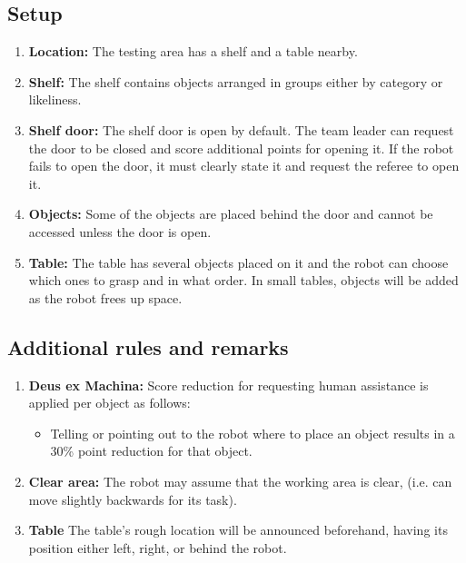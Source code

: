 \subsection{Setup}
\begin{enumerate}
	\item \textbf{Location:} The testing area has a shelf and a table nearby.

	\item \textbf{Shelf:} The shelf contains objects arranged in groups either by category or likeliness.

	\item \textbf{Shelf door:} The shelf door is open by default.
	The team leader can request the door to be closed and score additional points for opening it. If the robot fails to open the door, it must clearly state it and request the referee to open it.

	\item \textbf{Objects:} Some of the objects are placed behind the door and cannot be accessed unless the door is open.

	\item \textbf{Table:} The table has several objects placed on it and the robot can choose which ones to grasp and in what order. In small tables, objects will be added as the robot frees up space.
\end{enumerate}


%
%
\subsection{Additional rules and remarks}
\begin{enumerate}
		\item \textbf{Deus ex Machina:} Score reduction for requesting human assistance is applied per object as follows:
	\begin{itemize}[nosep]
		\item Telling or pointing out to the robot where to place an object results in a 30\% point reduction for that object.
	\end{itemize}

	\item \textbf{Clear area:} The robot may assume that the working area is clear, (i.e. can move slightly backwards for its task).

	\item \textbf{Table} The table's rough location will be announced beforehand, having its position either left, right, or behind the robot.
\end{enumerate}


